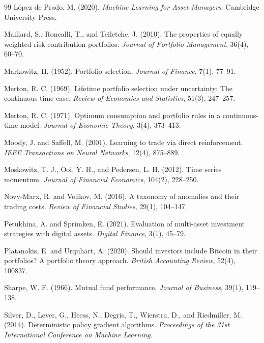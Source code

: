 \documentclass[12pt]{article}
\begin{document}
\begin{thebibliography}{99}
 López de Prado, M. (2020). \emph{Machine Learning for Asset Managers}. Cambridge University Press.

 Maillard, S., Roncalli, T., and Teiletche, J. (2010). The properties of equally weighted risk contribution portfolios. \emph{Journal of Portfolio Management}, 36(4), 60--70.

 Markowitz, H. (1952). Portfolio selection. \emph{Journal of Finance}, 7(1), 77--91.

 Merton, R. C. (1969). Lifetime portfolio selection under uncertainty: The continuous-time case. \emph{Review of Economics and Statistics}, 51(3), 247--257.

 Merton, R. C. (1971). Optimum consumption and portfolio rules in a continuous-time model. \emph{Journal of Economic Theory}, 3(4), 373--413.

 Moody, J. and Saffell, M. (2001). Learning to trade via direct reinforcement. \emph{IEEE Transactions on Neural Networks}, 12(4), 875--889.

 Moskowitz, T. J., Ooi, Y. H., and Pedersen, L. H. (2012). Time series momentum. \emph{Journal of Financial Economics}, 104(2), 228--250.

 Novy-Marx, R. and Velikov, M. (2016). A taxonomy of anomalies and their trading costs. \emph{Review of Financial Studies}, 29(1), 104--147.

 Petukhina, A. and Sprünken, E. (2021). Evaluation of multi-asset investment strategies with digital assets. \emph{Digital Finance}, 3(1), 45--79.

 Platanakis, E. and Urquhart, A. (2020). Should investors include Bitcoin in their portfolios? A portfolio theory approach. \emph{British Accounting Review}, 52(4), 100837.

 Sharpe, W. F. (1966). Mutual fund performance. \emph{Journal of Business}, 39(1), 119--138.

 Silver, D., Lever, G., Heess, N., Degris, T., Wierstra, D., and Riedmiller, M. (2014). Deterministic policy gradient algorithms. \emph{Proceedings of the 31st International Conference on Machine Learning}.


\end{thebibliography}
\end{document}
